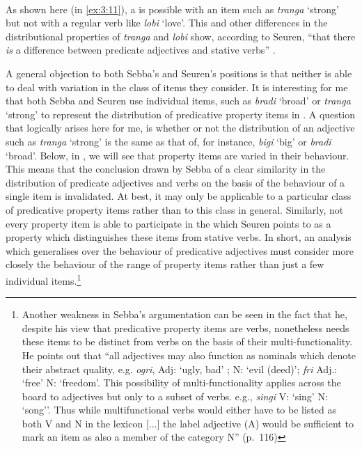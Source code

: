 \ea%
\label{ex:3:11}
 \citep[127]{Seuren1986}\\

 \z \z


As shown here (in \ref{ex:3:11}), a  is possible with an item such as
\textit{tranga} ‘strong’ but not with a regular  verb like
\textit{lobi} `love'.  This and other differences in the
distributional properties of \textit{tranga} and \textit{lobi} show,
according to Seuren, ``that there \textit{is} a difference between
predicate adjectives and stative verbs” \citep[127]{Seuren1986}.

A general objection to both Sebba’s and Seuren’s positions is that
neither is able to deal with variation in the class of items they
consider.  It is interesting for me that both Sebba and Seuren use
individual items, such as \textit{bradi} `broad' or \textit{tranga} `strong' 
to represent the distribution of predicative property
items in .  A question that logically arises here for me, is
whether or not the distribution of an adjective such as \textit{tranga}
`strong' is the same as that of, for instance, \textit{bigi} `big'
or \textit{bradi} `broad'.  Below, in , we will see
that property items are varied in their behaviour.  This means that
the conclusion drawn by Sebba of a clear similarity in the
distribution of predicate adjectives and  verbs on the basis of
the behaviour of a single item is invalidated.  At best, it may only
be applicable to a particular class of predicative property items
rather than to this class in general.  Similarly, not every property
item is able to participate in the  which Seuren
points to as a property which distinguishes these items from stative
verbs.  In short, an analysis which generalises over the behaviour of
predicative adjectives must consider more closely the behaviour of the
range of property items rather than just a few individual
items.\footnote{Another weakness in Sebba’s argumentation can be seen
  in the fact that he, despite his view that predicative property
  items are  verbs, nonetheless needs these items to be
  distinct from  verbs on the basis of their
  multi-functionality. He points out that ``all  adjectives may
  also function as nominals which denote their abstract quality,
  e.g. \textit{ogri}, Adj: `ugly, bad' ; N: `evil (deed)';
  \textit{fri} Adj.: `free' N: `freedom'. This possibility of
  multi-functionality applies across the board to  adjectives
  but only to a subset of verbs. e.g., \textit{singi} V: `sing' N:
  `song''. Thus while multifunctional verbs would either have to be
  listed as both V and N in the lexicon [...] the label adjective (A)
  would be sufficient to mark an item as also a member of the category
  N” (p.~116)}

